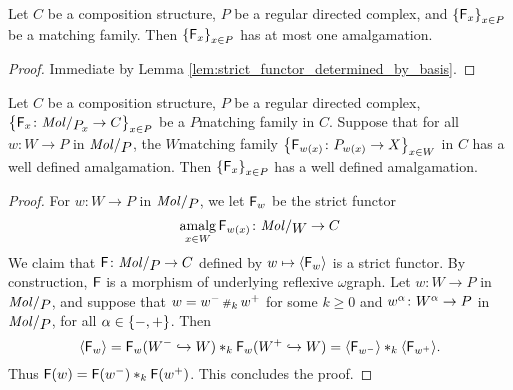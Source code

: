 \begin{lem}\label{lem:at_most_one_lift}
    Let \( C \) be a composition structure, \( P \) be a regular directed complex, and \( \left\{ {\mathsf{F}_x} \right\}_{x \in P} \) be a matching family. 
    Then \( \left\{ {\mathsf{F}_x} \right\}_{x \in P} \) has at most one amalgamation.
\end{lem}
\begin{proof}
    Immediate by Lemma \ref{lem:strict_functor_determined_by_basis}.
\end{proof}

\begin{lem} \label{lem:well_define_from_regular_iff_well_defined_from_molecules}
    Let \( C \) be a composition structure, \( P \) be a regular directed complex, \( \set{\F_x \colon \molecin{\imel{P}{x}} \to C}_{x \in P} \) be a \( P \)\nbd matching family in \( C \). 
    Suppose that for all \( w \colon W \to P \) in \( \molecin{P} \), the \( W \)\nbd matching family \( \left\{ {\mathsf{F}_{w(x)} \colon {P}_{w(x)} \to X} \right\}_{x \in W} \) in \( C \) has a well defined amalgamation.
    Then \( \left\{ {\mathsf{F}_x} \right\}_{x \in P} \) has a well defined amalgamation.
\end{lem}
\begin{proof}
    For \( w \colon W \to P \) in \( \molecin{P} \), we let \( \mathsf{F}_w \) be the strict functor 
    \begin{equation*}
        \amalg_{x \in W} \F_{w(x)} \colon \molecin{W} \to C
    \end{equation*}
    We claim that \( \F \colon \molecin{P} \to C \) defined by \( w \mapsto \langle\mathsf{F}_w\rangle \) is a strict functor.
    By construction, \( \mathsf{F} \) is a morphism of underlying reflexive \( \omega \)\nbd graph.
    Let \( w \colon W \to P \) in \( \molecin{P} \), and suppose that \( w = w^- \,{\scriptstyle\#}_{k}\, w^+ \) for some \( k \geq 0 \) and \( w^\alpha \colon W^\alpha \to P \) in \( \molecin{P} \), for all \( \alpha \in \left\{ {-, +} \right\} \).
    Then
    \begin{equation*}
        \langle\mathsf{F}_w\rangle = \mathsf{F}_w(W^- \hookrightarrow W) *_{k} \mathsf{F}_w(W^+ \hookrightarrow W) = \langle\mathsf{F}_{w^-}\rangle *_{k} \langle\mathsf{F}_{w^+}\rangle.
    \end{equation*}
    Thus \( \mathsf{F}(w) = \mathsf{F}(w^-) *_{k} \mathsf{F}(w^+) \).
    This concludes the proof.
\end{proof}

